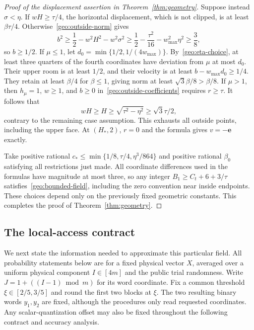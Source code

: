 \begin{proof}[Proof of the displacement assertion in Theorem~\ref{thm:geometry}]
Suppose instead $\sigma<\eta$. If $wH\ge\tau/4$, the horizontal
displacement, which is not clipped, is at least $\beta\tau/4$.
Otherwise~\eqref{geo:outside-norm} gives
\[
 b^2\ge\frac12-w^2H^2-w^2\sigma^2
       \ge\frac12-\frac{\tau^2}{16}-w_{\max}^2\eta^2
       \ge\frac38,
\]
so $b\ge1/2$. If $\mu\le1$, let
$d_0=\min\{1/2,1/(4w_{\max})\}$. By~\eqref{geo:eta-choice}, at
least three quarters of the fourth coordinates have deviation from
$\mu$ at most $d_0$. Their upper room is at least $1/2$, and their
velocity is at least $b-w_{\max}d_0\ge1/4$. They retain at least
$\beta/4$ for $\beta\le1$, giving norm at least
$\sqrt3\beta/8>\beta/8$. If $\mu>1$, then $h_\mu=1$, $w\ge1$,
and $b\ge0$ in~\eqref{geo:outside-coefficients} requires $r\ge\tau$.
It follows that
\[
 wH\ge H\ge\sqrt{\tau^2-\eta^2}\ge\sqrt3\tau/2,
\]
contrary to the remaining case assumption. This exhausts all outside
points, including the upper face. At $(H_*,2)$, $r=0$ and the formula
gives $v=-\mathbf e$ exactly.

Take positive rational
$c_*\le\min\{1/8,\tau/4,\eta^3/864\}$ and positive rational
$\beta_0$ satisfying all restrictions just made. All coordinate
differences used in the formulas have magnitude at most three, so any
integer $B_1\ge C_t+6+3/\tau$ satisfies~\eqref{geo:bounded-field},
including the zero convention near inside endpoints. These choices
depend only on the previously fixed geometric constants. This completes
the proof of Theorem~\ref{thm:geometry}.
\end{proof}

\subsection{The local-access contract}
\label{geo:access}

We next state the information needed to approximate this particular
field. All probability statements below are for a fixed physical vector
$X$, averaged over a uniform physical component $I\in[4m]$ and the
public trial randomness. Write $J=1+((I-1)\bmod m)$ for its word
coordinate. Fix a common threshold $\xi\in[2/5,3/5]$ and round the
first two blocks at $\xi$. The two resulting binary words $y_1,y_2$
are fixed, although the procedures only read requested coordinates.
Any scalar-quantization offset may also be fixed throughout the following
contract and accuracy analysis.

